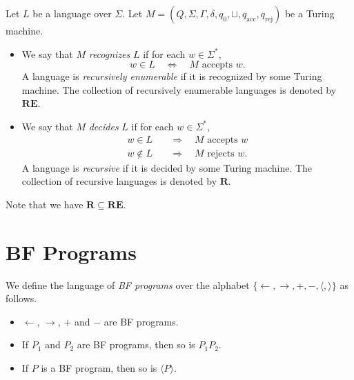 \begin{definition}
  Let $L$ be a language over $\Sigma$.
  Let $M = (Q, \Sigma, \Gamma, \delta, q_0, \sqcup, q_\text{acc},
  q_\text{rej})$ be a Turing machine.
  \begin{itemize}
    \item We say that $M$ \emph{recognizes} $L$ if for each $w \in \Sigma^*$,
    \begin{equation*}
      w \in L
      \quad \Leftrightarrow \quad
      \text{$M$ accepts $w$}.
    \end{equation*}
    A language is \emph{recursively enumerable} if it is recognized by some
    Turing machine.
    The collection of recursively enumerable languages is denoted by
    $\mathbf{RE}$.
    \item We say that $M$ \emph{decides} $L$ if for each $w \in \Sigma^*$,
    \begin{align*}
      w \in L
      \quad &\Rightarrow \quad
      \text{$M$ accepts $w$} \\
      w \notin L
      \quad &\Rightarrow \quad
      \text{$M$ rejects $w$}.
    \end{align*}
    A language is \emph{recursive} if it is decided by some Turing machine.
    The collection of recursive languages is denoted by $\mathbf{R}$.
  \end{itemize}
\end{definition}
\begin{remark}
  Note that we have $\mathbf{R} \subseteq \mathbf{RE}$.
\end{remark}

\section{BF Programs}
\begin{definition}
  We define the language of \emph{BF programs} over the alphabet
  $\{\leftarrow, \rightarrow, +, -, \langle, \rangle\}$ as follows.
  \begin{itemize}
    \item $\leftarrow$, $\rightarrow$, $+$ and $-$ are BF programs.
    \item If $P_1$ and $P_2$ are BF programs, then so is $P_1P_2$.
    \item If $P$ is a BF program, then so is $\langle P \rangle$.
  \end{itemize}
\end{definition}

